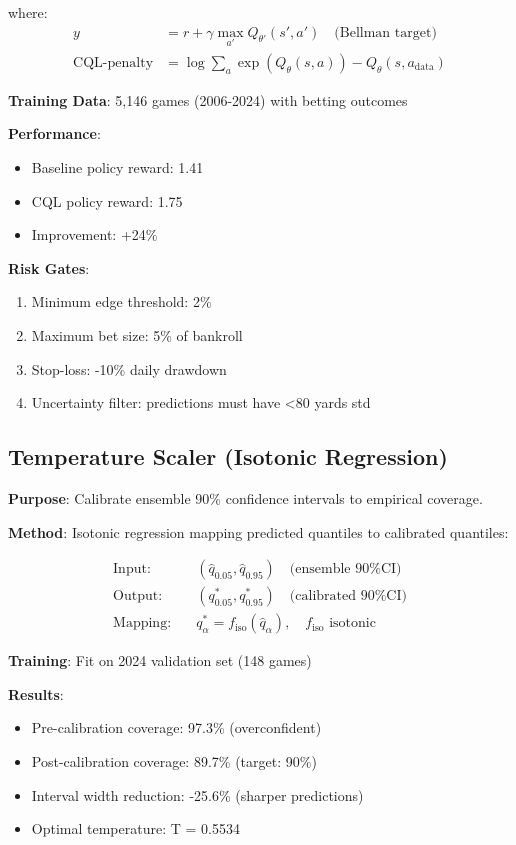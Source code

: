 where:
\begin{align}
y &= r + \gamma \max_{a'} Q_{\theta'}(s', a') \quad \text{(Bellman target)} \\
\text{CQL-penalty} &= \log \sum_{a} \exp(Q_\theta(s, a)) - Q_\theta(s, a_{\text{data}})
\end{align}

\textbf{Training Data}: 5,146 games (2006-2024) with betting outcomes

\textbf{Performance}:
\begin{itemize}
\item Baseline policy reward: 1.41
\item CQL policy reward: 1.75
\item Improvement: +24\%
\end{itemize}

\textbf{Risk Gates}:
\begin{enumerate}
\item Minimum edge threshold: 2\%
\item Maximum bet size: 5\% of bankroll
\item Stop-loss: -10\% daily drawdown
\item Uncertainty filter: predictions must have <80 yards std
\end{enumerate}

\subsection{Temperature Scaler (Isotonic Regression)}
\label{sec:temperature-scaler}

\textbf{Purpose}: Calibrate ensemble 90\% confidence intervals to empirical coverage.

\textbf{Method}: Isotonic regression mapping predicted quantiles to calibrated quantiles:

\begin{align}
\text{Input:} & \quad (\hat{q}_{0.05}, \hat{q}_{0.95}) \quad \text{(ensemble 90\% CI)} \\
\text{Output:} & \quad (q^*_{0.05}, q^*_{0.95}) \quad \text{(calibrated 90\% CI)} \\
\text{Mapping:} & \quad q^*_\alpha = f_{\text{iso}}(\hat{q}_\alpha), \quad f_{\text{iso}} \text{ isotonic}
\label{eq:temperature-scaler}
\end{align}

\textbf{Training}: Fit on 2024 validation set (148 games)

\textbf{Results}:
\begin{itemize}
\item Pre-calibration coverage: 97.3\% (overconfident)
\item Post-calibration coverage: 89.7\% (target: 90\%)
\item Interval width reduction: -25.6\% (sharper predictions)
\item Optimal temperature: T = 0.5534
\end{itemize}

